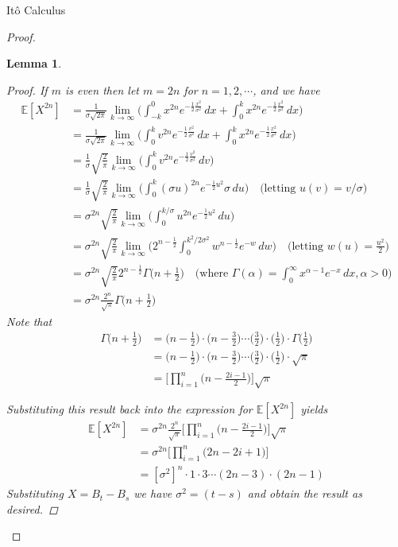 \documentclass[12pt]{article}
\newtheorem{lemma}{Lemma}
\begin{document}
\begin{section}{It\^{o} Calculus}
\begin{proof}
\begin{lemma}
\begin{proof}
If $m$ is even then let $m = 2n$ for $n = 1,2,\cdots$, and we have
\begin{align*}
	\mathbb E[X^{2n}] &= \frac{1}{\sigma\sqrt{2\pi}}\lim_{k\to\infty}\Bigg(\int^0_{-k} x^{2n}e^{-\frac{1}{2}\frac{x^2}{\sigma^2}}\,dx + \int^k_{0} x^{2n}e^{-\frac{1}{2}\frac{x^2}{\sigma^2}}\,dx\Bigg)\\
	&= \frac{1}{\sigma\sqrt{2\pi}}\lim_{k\to\infty}\Bigg(\int^k_{0} v^{2n}e^{-\frac{1}{2}\frac{v^2}{\sigma^2}}\,dx + \int^k_{0} x^{2n}e^{-\frac{1}{2}\frac{x^2}{\sigma^2}}\,dx\Bigg) \\
	&= \frac{1}{\sigma}\sqrt{\frac{2}{\pi}}\lim_{k\to\infty}\Bigg(\int^k_0 v^{2n}e^{-\frac{1}{2}\frac{v^2}{\sigma^2}}\,dv\Bigg) \\
	&= \frac{1}{\sigma}\sqrt{\frac{2}{\pi}}\lim_{k\to\infty}\Bigg(\int^k_0 (\sigma u)^{2n}e^{-\frac{1}{2}u^2}\sigma\,du \Bigg) \quad \text{(letting $u(v) = v/\sigma$)} \\
	&= \sigma^{2n}\sqrt{\frac{2}{\pi}}\lim_{k\to\infty}\Bigg(\int^{k/\sigma}_0 u^{2n}e^{-\frac{1}{2}u^2}\,du\Bigg) \\
	&=  \sigma^{2n}\sqrt{\frac{2}{\pi}}\lim_{k\to\infty}\Bigg(2^{n-\frac{1}{2}}\int^{k^2/2\sigma^2}_0 w^{n-\frac{1}{2}}e^{-w}\,dw\Bigg) \quad \text{(letting $w(u) = \frac{u^2}{2})$} \\
	&=  \sigma^{2n}\sqrt{\frac{2}{\pi}}2^{n-\frac{1}{2}}\Gamma\Big(n + \frac{1}{2}\Big) \quad \Big(\text{where } \Gamma(\alpha) = \int^\infty_0 x^{\alpha-1}e^{-x}\,dx, \alpha > 0 \Big) \\
	&= \sigma^{2n}\frac{2^n}{\sqrt{\pi}}\Gamma\Big(n + \frac{1}{2}\Big)
\end{align*}
Note that
\begin{align*}
	\Gamma\Big(n + \frac{1}{2}\Big) &= \Big(n - \frac{1}{2}\Big)\cdot\Big(n - \frac{3}{2}\Big)\cdots \Big(\frac{3}{2}\Big)\cdot\Big(\frac{1}{2}\Big)\cdot\Gamma\Big(\frac{1}{2}\Big) \\
	&= \Big(n - \frac{1}{2}\Big)\cdot\Big(n - \frac{3}{2}\Big)\cdots \Big(\frac{3}{2}\Big)\cdot\Big(\frac{1}{2}\Big)\cdot\sqrt{\pi} \\
	&= \Big[\prod^n_{i=1}\Big(n - \frac{2i - 1}{2}\Big)\Big]\sqrt{\pi}
\end{align*}

Substituting this result back into the expression for $\mathbb E[X^{2n}]$ yields
\begin{align*}
	\mathbb E[X^{2n}] &= \sigma^{2n}\frac{2^n}{\sqrt{\pi}}\Big[\prod^n_{i=1}\Big(n - \frac{2i - 1}{2}\Big)\Big]\sqrt{\pi} \\
	&= \sigma^{2n}\Big[\prod^n_{i=1}\Big(2n - 2i + 1\Big)\Big] \\
	&= [\sigma^{2}]^n\cdot1\cdot3\cdots(2n-3)\cdot(2n-1)
\end{align*}
Substituting $X = B_t - B_s$ we have $\sigma^2 = (t - s)$ and obtain the result as desired.
\end{proof}
\end{lemma}


\end{proof}
\end{section}
\end{document}
